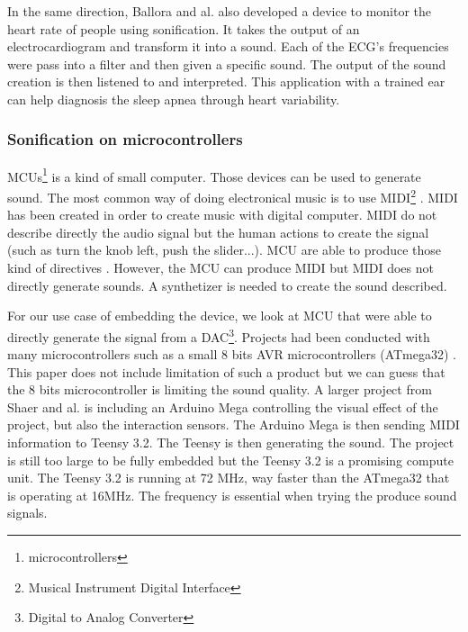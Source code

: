 In the same direction, Ballora and al. \cite{ballora2012use} also developed a device to monitor the heart rate of people
using sonification. It takes the output of an electrocardiogram and transform it into a sound. Each of the ECG's frequencies
were pass into a filter and then given a specific sound.  
The output of the sound creation is then listened to and interpreted. This application with a trained ear can help
diagnosis the sleep apnea through heart variability.


\subsubsection{Sonification on microcontrollers}

MCUs\footnote{microcontrollers} \cite{rochim2019design} is a kind of small computer.
Those devices can be used to generate sound. The most common way of doing electronical music
is to use MIDI\footnote{Musical Instrument Digital Interface} \cite{loyMusiciansMakeStandard1985}.
MIDI has been created in order to create music with digital computer. MIDI do not describe directly 
the audio signal but the human actions to create the signal (such as turn the knob left, push the slider...).
MCU are able to produce those kind of directives \cite{fazendaProceedingsInternationalConference1}\cite{fazendaProceedingsInternationalConference2}.
However, the MCU can produce MIDI but MIDI does not directly generate sounds. A synthetizer is needed to create the sound
described.

For our use case of embedding the device, we look at MCU that were able to directly generate the signal 
from a DAC\footnote{Digital to Analog Converter}. Projects had been conducted with many microcontrollers such as a small
8 bits AVR microcontrollers (ATmega32) \cite{hussainAVRMicrocontrollerImplementation2011}. This paper does not include limitation of
such a product but we can guess that the 8 bits microcontroller is limiting the sound quality. A larger project from Shaer and al.
\cite{shaerInteractiveCapacitiveTouch2020} is including an Arduino Mega controlling the visual effect of the project,
but also the interaction sensors. The Arduino Mega is then sending MIDI information to Teensy 3.2. The Teensy is then 
generating the sound. The project is still too large to be fully embedded but the Teensy 3.2 is a promising compute unit.
The Teensy 3.2 is running at 72 MHz, way faster than the ATmega32 that is operating at 16MHz. The frequency is essential
when trying the produce sound signals.


